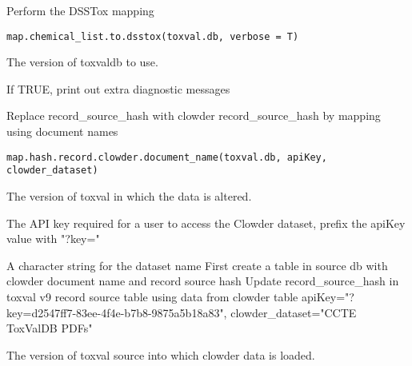 \documentclass[letterpaper]{book}
\begin{document}
%
\begin{Description}\relax
Perform the DSSTox mapping
\end{Description}
%
\begin{Usage}
\begin{verbatim}
map.chemical_list.to.dsstox(toxval.db, verbose = T)
\end{verbatim}
\end{Usage}
%
\begin{Arguments}
\begin{ldescription}
\item[\code{toxval.db}] The version of toxvaldb to use.

\item[\code{verbose}] If TRUE, print out extra diagnostic messages
\end{ldescription}
\end{Arguments}
%
\begin{Description}\relax
Replace record\_source\_hash with clowder record\_source\_hash by mapping using document names
\end{Description}
%
\begin{Usage}
\begin{verbatim}
map.hash.record.clowder.document_name(toxval.db, apiKey, clowder_dataset)
\end{verbatim}
\end{Usage}
%
\begin{Arguments}
\begin{ldescription}
\item[\code{toxval.db}] The version of toxval in which the data is altered.

\item[\code{apiKey}] The API key required for a user to access the Clowder dataset, prefix the apiKey value with "?key="

\item[\code{clowder\_dataset}] A character string for the dataset name
First create a table in source db with clowder document name and record source hash
Update record\_source\_hash in toxval v9 record source table using data from clowder table 
apiKey="?key=d2547ff7-83ee-4f4e-b7b8-9875a5b18a83", clowder\_dataset="CCTE ToxValDB PDFs"

\item[\code{source.db}] The version of toxval source into which clowder data is loaded.
\end{ldescription}
\end{Arguments}
\end{document}
